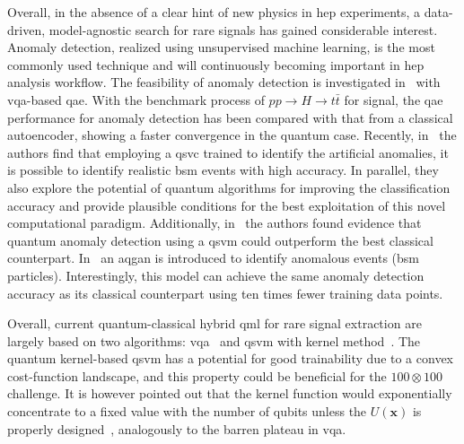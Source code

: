 Overall, in the absence of a clear hint of new physics in \gls{hep} experiments, a data-driven, model-agnostic search for rare signals has gained considerable interest. Anomaly detection, realized using unsupervised machine learning, is the most commonly used technique and will continuously becoming important in \gls{hep} analysis workflow. 
The feasibility of anomaly detection is investigated in~\cite{PhysRevD.105.095004} with \gls{vqa}-based \gls{qae}. With the benchmark process of $pp \to H \to t\bar{t}$ for signal, the \gls{qae} performance for anomaly detection has been compared with that from a classical autoencoder, showing a faster convergence in the quantum case. Recently, in~\cite{schuhmacher2023unravelling}
 the authors find that employing a \gls{qsvc} trained to identify the artificial anomalies, it is possible to identify realistic \gls{bsm} events with high accuracy. In parallel, they also explore the potential of quantum algorithms for improving the classification accuracy and provide plausible conditions for the best exploitation of this novel computational paradigm. Additionally, in~\cite{QADCERN}  the authors found evidence that quantum anomaly detection using a \gls{qsvm} could outperform the best classical counterpart.  In~\cite{bermot2023quantum} an \gls{aqgan} is introduced to identify anomalous events (\gls{bsm} particles). Interestingly, this model can achieve the same anomaly detection accuracy as its classical counterpart using ten times fewer training data points. 


Overall, current quantum-classical hybrid \gls{qml} for rare signal extraction are  largely based on two algorithms: \gls{vqa}~\cite{VQA2021} and \gls{qsvm} with kernel method~\cite{havlivcek2019supervised,Schuld2019QML}.
The quantum kernel-based \gls{qsvm} has a potential for good trainability due to a convex cost-function landscape, and this property could be beneficial for the $100 \otimes 100$ challenge. It is however pointed out that the kernel function would exponentially concentrate to a fixed value with the number of qubits unless the $U({\boldsymbol x})$ is properly designed~\cite{thanasilp2022exponential}, analogously to the barren plateau in \gls{vqa}. 

